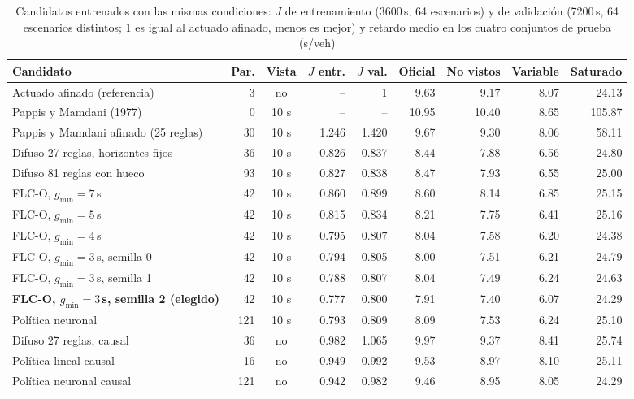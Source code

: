 \begin{table}[t]
\centering
\caption{Candidatos entrenados con las mismas condiciones: $J$ de entrenamiento (3600\,s, 64 escenarios) y de validación (7200\,s, 64 escenarios distintos; 1 es igual al actuado afinado, menos es mejor) y retardo medio en los cuatro conjuntos de prueba (s/veh)}
\label{tab:jmodelos}
\footnotesize
\setlength{\tabcolsep}{3.5pt}
\begin{tabular}{@{}p{5.3cm}rcrrrrrr@{}}
\toprule
Candidato & Par. & Vista & $J$ entr. & $J$ val. & Oficial & No vistos & Variable & Saturado \\
\midrule
Actuado afinado (referencia) & 3 & no & -- & 1 & 9.63 & 9.17 & 8.07 & 24.13 \\
Pappis y Mamdani (1977) & 0 & 10 s & -- & -- & 10.95 & 10.40 & 8.65 & 105.87 \\
\midrule
Pappis y Mamdani afinado (25 reglas) & 30 & 10 s & 1.246 & 1.420 & 9.67 & 9.30 & 8.06 & 58.11 \\
\midrule
Difuso 27 reglas, horizontes fijos & 36 & 10 s & 0.826 & 0.837 & 8.44 & 7.88 & 6.56 & 24.80 \\
Difuso 81 reglas con hueco & 93 & 10 s & 0.827 & 0.838 & 8.47 & 7.93 & 6.55 & 25.00 \\
\midrule
FLC-O, $g_{\min}=7$\,s & 42 & 10 s & 0.860 & 0.899 & 8.60 & 8.14 & 6.85 & 25.15 \\
FLC-O, $g_{\min}=5$\,s & 42 & 10 s & 0.815 & 0.834 & 8.21 & 7.75 & 6.41 & 25.16 \\
FLC-O, $g_{\min}=4$\,s & 42 & 10 s & 0.795 & 0.807 & 8.04 & 7.58 & 6.20 & 24.38 \\
FLC-O, $g_{\min}=3$\,s, semilla 0 & 42 & 10 s & 0.794 & 0.805 & 8.00 & 7.51 & 6.21 & 24.79 \\
FLC-O, $g_{\min}=3$\,s, semilla 1 & 42 & 10 s & 0.788 & 0.807 & 8.04 & 7.49 & 6.24 & 24.63 \\
\textbf{FLC-O, $g_{\min}=3$\,s, semilla 2 (elegido)} & 42 & 10 s & 0.777 & 0.800 & 7.91 & 7.40 & 6.07 & 24.29 \\
\midrule
Política neuronal & 121 & 10 s & 0.793 & 0.809 & 8.09 & 7.53 & 6.24 & 25.10 \\
\midrule
Difuso 27 reglas, causal & 36 & no & 0.982 & 1.065 & 9.97 & 9.37 & 8.41 & 25.74 \\
Política lineal causal & 16 & no & 0.949 & 0.992 & 9.53 & 8.97 & 8.10 & 25.11 \\
Política neuronal causal & 121 & no & 0.942 & 0.982 & 9.46 & 8.95 & 8.05 & 24.29 \\
\bottomrule
\end{tabular}
\end{table}
